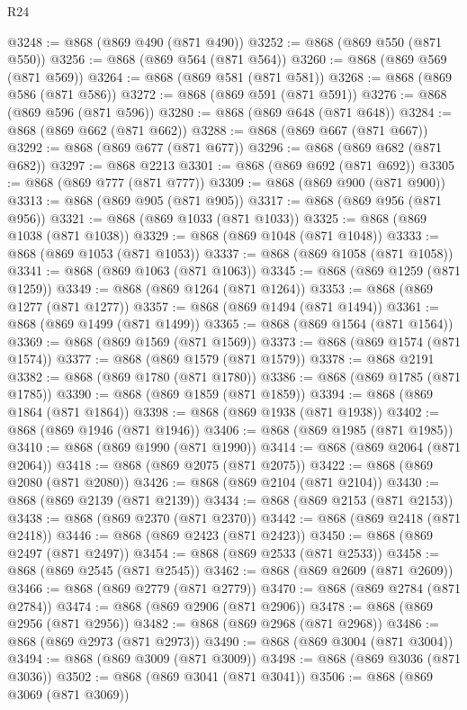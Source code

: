 \begin{lexlean}{R24}
\begin{coremodule}
@3248 := @868 (@869 @490 (@871 @490))
@3252 := @868 (@869 @550 (@871 @550))
@3256 := @868 (@869 @564 (@871 @564))
@3260 := @868 (@869 @569 (@871 @569))
@3264 := @868 (@869 @581 (@871 @581))
@3268 := @868 (@869 @586 (@871 @586))
@3272 := @868 (@869 @591 (@871 @591))
@3276 := @868 (@869 @596 (@871 @596))
@3280 := @868 (@869 @648 (@871 @648))
@3284 := @868 (@869 @662 (@871 @662))
@3288 := @868 (@869 @667 (@871 @667))
@3292 := @868 (@869 @677 (@871 @677))
@3296 := @868 (@869 @682 (@871 @682))
@3297 := @868 @2213
@3301 := @868 (@869 @692 (@871 @692))
@3305 := @868 (@869 @777 (@871 @777))
@3309 := @868 (@869 @900 (@871 @900))
@3313 := @868 (@869 @905 (@871 @905))
@3317 := @868 (@869 @956 (@871 @956))
@3321 := @868 (@869 @1033 (@871 @1033))
@3325 := @868 (@869 @1038 (@871 @1038))
@3329 := @868 (@869 @1048 (@871 @1048))
@3333 := @868 (@869 @1053 (@871 @1053))
@3337 := @868 (@869 @1058 (@871 @1058))
@3341 := @868 (@869 @1063 (@871 @1063))
@3345 := @868 (@869 @1259 (@871 @1259))
@3349 := @868 (@869 @1264 (@871 @1264))
@3353 := @868 (@869 @1277 (@871 @1277))
@3357 := @868 (@869 @1494 (@871 @1494))
@3361 := @868 (@869 @1499 (@871 @1499))
@3365 := @868 (@869 @1564 (@871 @1564))
@3369 := @868 (@869 @1569 (@871 @1569))
@3373 := @868 (@869 @1574 (@871 @1574))
@3377 := @868 (@869 @1579 (@871 @1579))
@3378 := @868 @2191
@3382 := @868 (@869 @1780 (@871 @1780))
@3386 := @868 (@869 @1785 (@871 @1785))
@3390 := @868 (@869 @1859 (@871 @1859))
@3394 := @868 (@869 @1864 (@871 @1864))
@3398 := @868 (@869 @1938 (@871 @1938))
@3402 := @868 (@869 @1946 (@871 @1946))
@3406 := @868 (@869 @1985 (@871 @1985))
@3410 := @868 (@869 @1990 (@871 @1990))
@3414 := @868 (@869 @2064 (@871 @2064))
@3418 := @868 (@869 @2075 (@871 @2075))
@3422 := @868 (@869 @2080 (@871 @2080))
@3426 := @868 (@869 @2104 (@871 @2104))
@3430 := @868 (@869 @2139 (@871 @2139))
@3434 := @868 (@869 @2153 (@871 @2153))
@3438 := @868 (@869 @2370 (@871 @2370))
@3442 := @868 (@869 @2418 (@871 @2418))
@3446 := @868 (@869 @2423 (@871 @2423))
@3450 := @868 (@869 @2497 (@871 @2497))
@3454 := @868 (@869 @2533 (@871 @2533))
@3458 := @868 (@869 @2545 (@871 @2545))
@3462 := @868 (@869 @2609 (@871 @2609))
@3466 := @868 (@869 @2779 (@871 @2779))
@3470 := @868 (@869 @2784 (@871 @2784))
@3474 := @868 (@869 @2906 (@871 @2906))
@3478 := @868 (@869 @2956 (@871 @2956))
@3482 := @868 (@869 @2968 (@871 @2968))
@3486 := @868 (@869 @2973 (@871 @2973))
@3490 := @868 (@869 @3004 (@871 @3004))
@3494 := @868 (@869 @3009 (@871 @3009))
@3498 := @868 (@869 @3036 (@871 @3036))
@3502 := @868 (@869 @3041 (@871 @3041))
@3506 := @868 (@869 @3069 (@871 @3069))

\end{coremodule}
\end{lexlean}
